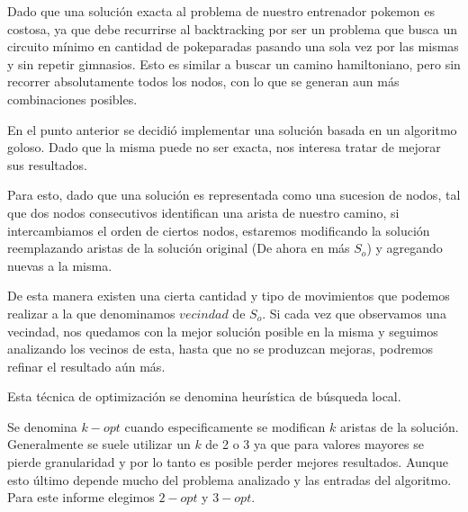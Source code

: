 Dado que una solución exacta al problema de nuestro entrenador pokemon es costosa, ya que debe recurrirse al backtracking por ser un problema que busca un circuito mínimo en cantidad de pokeparadas pasando una sola vez por las mismas y sin repetir gimnasios. Esto es similar a buscar un camino hamiltoniano, pero sin recorrer absolutamente todos los nodos, con lo que se generan aun más combinaciones posibles.

En el punto anterior se decidió implementar una solución basada en un algoritmo goloso. Dado que la misma puede no ser exacta, nos interesa tratar de mejorar sus resultados. 

Para esto, dado que una solución es representada como una sucesion de nodos, tal que dos nodos consecutivos identifican una arista de nuestro camino, si intercambiamos el orden de ciertos nodos, estaremos modificando la solución reemplazando aristas de la solución original (De ahora en más $S_o$) y agregando nuevas a la misma. 

De esta manera existen una cierta cantidad y tipo de movimientos que podemos realizar a la que denominamos $vecindad$ de $S_o$. 
Si cada vez que observamos una vecindad, nos quedamos con la mejor solución posible en la misma y seguimos analizando los vecinos de esta, hasta que no se produzcan mejoras, podremos refinar el resultado aún más.

Esta técnica de optimización se denomina heurística de búsqueda local.

Se denomina $k-opt$ cuando especificamente se modifican $k$ aristas de la solución. Generalmente se suele utilizar un $k$ de 2 o 3 ya que para valores mayores se pierde granularidad y por lo tanto es posible perder mejores resultados. Aunque esto último depende mucho del problema analizado y las entradas del algoritmo. Para este informe elegimos $2-opt$ y $3-opt$.

